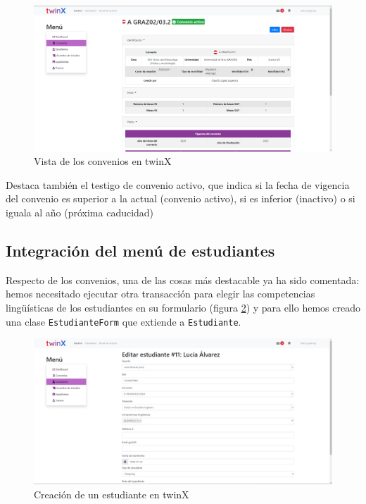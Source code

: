 \begin{figure}
	\centering
	\includegraphics[width=\linewidth]{Capturas de twinX/vista_convenio}
	\caption{Vista de los convenios en twinX}
	\label{fig:vistaconveniotwinX}
\end{figure}


Destaca también el testigo de convenio activo, que indica si la fecha de vigencia del convenio es superior a la actual (convenio activo), si es inferior (inactivo) o si iguala al año (próxima caducidad)

\subsection{Integración del menú de estudiantes}

Respecto de los convenios, una de las cosas más destacable ya ha sido comentada: hemos necesitado ejecutar otra transacción para elegir las competencias lingüísticas de los estudiantes en su formulario (figura \ref{fig:formularioestudiantetwinX}) y para ello hemos creado una clase \texttt{EstudianteForm} que extiende a \texttt{Estudiante}.

\begin{figure}
	\centering
	\includegraphics[width=\linewidth]{Capturas de twinX/formulario_estudiante}
	\caption{Creación de un estudiante en twinX}
	\label{fig:formularioestudiantetwinX}
\end{figure}


